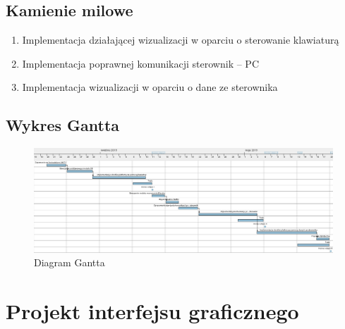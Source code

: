 \documentclass[10pt, a4paper]{article}
\begin{document}
	\subsection{Kamienie milowe}
		\begin{enumerate}
			\item Implementacja działającej wizualizacji w oparciu o sterowanie klawiaturą
			\item Implementacja poprawnej komunikacji sterownik -- PC
			\item Implementacja wizualizacji w oparciu o dane ze sterownika
		\end{enumerate}
	
	\subsection{Wykres Gantta}
	
	\begin{figure}[H]
		\centering
		\includegraphics[width=1.4\textwidth, angle = 90]{figures/harm1.png}
		\caption{Diagram Gantta}
		\label{fig:DiagramGantta}
	\end{figure}

\section{Projekt interfejsu graficznego}
\end{document}
